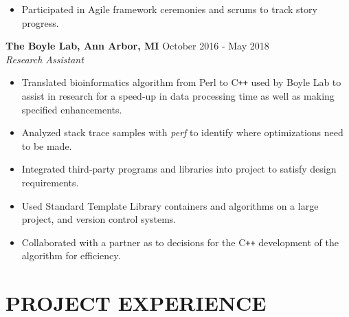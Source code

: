 \documentclass[overlapped]{res}
\begin{document}
\begin{resume}
\begin{itemize}
                  \item Participated in Agile framework ceremonies and 
                  scrums to track story progress.

                \end{itemize}

                \textbf{The Boyle Lab, Ann Arbor, MI}
                \hfill October 2016 - May 2018 \\
                {\sl Research Assistant}
                 \begin{itemize}  \itemsep -2pt %
                 \item Translated bioinformatics algorithm from Perl to C\texttt{++}
                 used by Boyle Lab to assist in research  for a
                    speed-up in data processing time as well as making specified enhancements.
                 \item Analyzed stack trace samples with \textit{perf} to identify
                 where optimizations need to be made.
                 
                 \item Integrated third-party programs and libraries into project to satisfy design requirements.
                 \item Used Standard Template Library containers and algorithms on a large project, 
                 and version control systems.
                 \item Collaborated with a partner as to decisions for the 
                 C\texttt{++} development of the algorithm for efficiency.
                \end{itemize}


 \section{PROJECT EXPERIENCE}
      

\end{resume}
\end{document}
